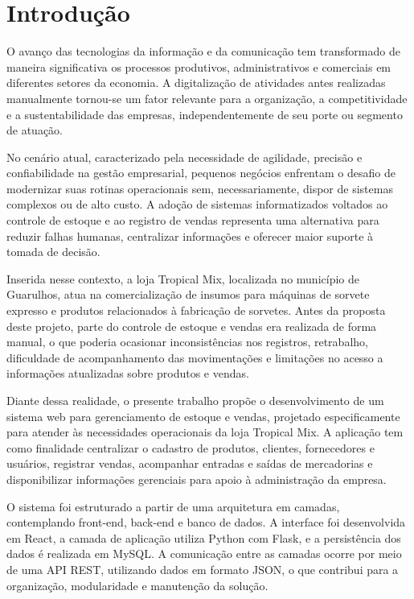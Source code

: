 \chapter{Introdução}

O avanço das tecnologias da informação e da comunicação tem transformado de maneira significativa os processos produtivos, administrativos e comerciais em diferentes setores da economia. A digitalização de atividades antes realizadas manualmente tornou-se um fator relevante para a organização, a competitividade e a sustentabilidade das empresas, independentemente de seu porte ou segmento de atuação.

No cenário atual, caracterizado pela necessidade de agilidade, precisão e confiabilidade na gestão empresarial, pequenos negócios enfrentam o desafio de modernizar suas rotinas operacionais sem, necessariamente, dispor de sistemas complexos ou de alto custo. A adoção de sistemas informatizados voltados ao controle de estoque e ao registro de vendas representa uma alternativa para reduzir falhas humanas, centralizar informações e oferecer maior suporte à tomada de decisão.

Inserida nesse contexto, a loja Tropical Mix, localizada no município de Guarulhos, atua na comercialização de insumos para máquinas de sorvete expresso e produtos relacionados à fabricação de sorvetes. Antes da proposta deste projeto, parte do controle de estoque e vendas era realizada de forma manual, o que poderia ocasionar inconsistências nos registros, retrabalho, dificuldade de acompanhamento das movimentações e limitações no acesso a informações atualizadas sobre produtos e vendas.

Diante dessa realidade, o presente trabalho propõe o desenvolvimento de um sistema web para gerenciamento de estoque e vendas, projetado especificamente para atender às necessidades operacionais da loja Tropical Mix. A aplicação tem como finalidade centralizar o cadastro de produtos, clientes, fornecedores e usuários, registrar vendas, acompanhar entradas e saídas de mercadorias e disponibilizar informações gerenciais para apoio à administração da empresa.

O sistema foi estruturado a partir de uma arquitetura em camadas, contemplando front-end, back-end e banco de dados. A interface foi desenvolvida em React, a camada de aplicação utiliza Python com Flask, e a persistência dos dados é realizada em MySQL. A comunicação entre as camadas ocorre por meio de uma API REST, utilizando dados em formato JSON, o que contribui para a organização, modularidade e manutenção da solução.

